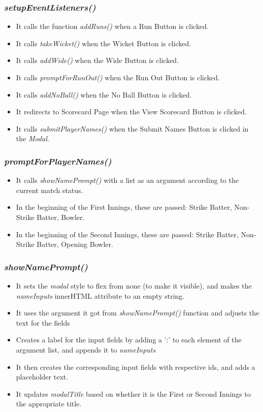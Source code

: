 \documentclass[a4paper,12pt]{article}
\begin{document}
\subsubsection{\textit{setupEventListeners()}}
\begin{itemize}
\item It calls the function \textit{addRuns()} when a Run Button is clicked.
\item It calls \textit{takeWicket()} when the Wicket Button is clicked.
\item It calls \textit{addWide()} when the Wide Button is clicked.
\item It calls \textit{promptForRunOut()} when the Run Out Button is clicked.
\item It calls \textit{addNoBall()} when the No Ball Button is clicked.
\item It redirects to Scorecard Page when the View Scorecard Button is clicked. 
\item It calls \textit{submitPlayerNames()} when the Submit Names Button is clicked in the \textit{Modal}.
\end{itemize}

\subsubsection{\textit{promptForPlayerNames()}}
\begin{itemize}
\item It calls \textit{showNamePrompt()} with a list as an argument according to the current match status. 
\item In the beginning of the First Innings, these are passed: Strike Batter, Non-Strike Batter, Bowler.
\item In the beginning of the Second Innings, these are passed: Strike Batter, Non-Strike Batter, Opening Bowler.   
\end{itemize}

\subsubsection{\textit{showNamePrompt()}}
\begin{itemize}
\item It sets the \textit{modal} style to flex from none (to make it visible), and makes the \textit{nameInputs} innerHTML attribute to an empty string.
\item It uses the argument it got from \textit{showNamePrompt()} function and adjusts the text for the fields
\item Creates a label for the input fields by adding a ':' to each element of the argument list, and appends it to \textit{nameInputs}
\item It then creates the corresponding input fields with respective ids, and adds a placeholder text.
\item It updates \textit{modalTitle} based on whether it is the First or Second Innings to the appropriate title.
\end{itemize}
\end{document}
